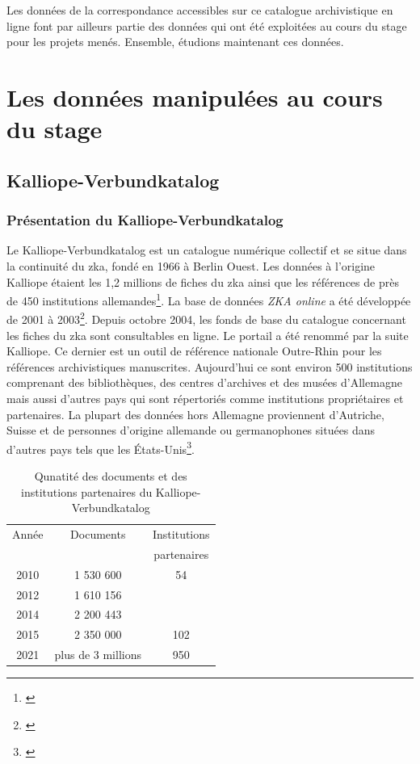 \documentclass[a4paper, 12pt, twoside]{book}
\begin{document}
Les données de la correspondance accessibles sur ce catalogue archivistique en ligne font par ailleurs partie des données qui ont été exploitées au cours du stage pour les projets menés. Ensemble, étudions maintenant ces données.

\section{Les données manipulées au cours du stage}
\label{sect:donnéesStage}
\subsection{Kalliope-Verbundkatalog}
\label{sub:kalliope}
\subsubsection{Présentation du Kalliope-Verbundkatalog}
Le Kalliope-Verbundkatalog est un catalogue numérique collectif et se situe dans la continuité  du  \gls{zka}, fondé en 1966 à Berlin Ouest. Les données à l'origine Kalliope étaient les 1,2 millions de fiches du \gls{zka} ainsi que les références de près de 450 institutions allemandes\footnote{\cite{noauthor_kalliope_nodate}}. La base de données \textit{ZKA online} a été développée de 2001 à 2003\footnote{\cite{noauthor_kalliope_nodate}}. Depuis octobre 2004, les fonds de base du catalogue concernant les fiches du \gls{zka} sont consultables en ligne. Le portail a été renommé par la suite Kalliope. Ce dernier est un outil de référence nationale Outre-Rhin pour les références archivistiques manuscrites.
Aujourd'hui ce sont environ 500 institutions comprenant des bibliothèques, des centres d'archives et des musées d'Allemagne mais aussi d'autres pays qui sont répertoriés comme institutions propriétaires et partenaires. La plupart des données hors Allemagne proviennent d'Autriche, Suisse et de personnes d'origine allemande ou germanophones situées dans d'autres pays tels que les États-Unis\footnote{\cite{noauthor_kalliope_nodate}}.

\begin{table}[h!]
    \centering
    \renewcommand*{\footnoterule}{}
    \begin{tabular}{|c|c|c|}
    \hline
         Année & Documents & Institutions \\
         & & partenaires\footnotemark \\ \hline
         2010 & 1 530 600 & 54\\
         2012 & 1 610 156 & \\
         2014 & 2 200 443 & \\
         2015 & 2 350 000  & 102 \\
         2021 & plus de 3 millions & 950 \\\hline
    \end{tabular}
    \caption{Qunatité des documents et des institutions partenaires du Kalliope-Verbundkatalog}
    \label{tab:docsKalliope}
\end{table}
\end{document}
